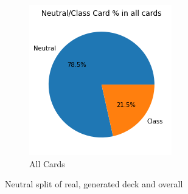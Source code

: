 \documentclass{report} %
\begin{document}
\begin{figure}[H]
\begin{subfigure}{.3\textwidth}
 \centering
 \includegraphics[width=.75\linewidth]{TestImages/NeutralSplitAllCards}
 \caption{All Cards}
\end{subfigure}
\caption{Neutral split of real, generated deck and overall}
\end{figure}
\end{document}
